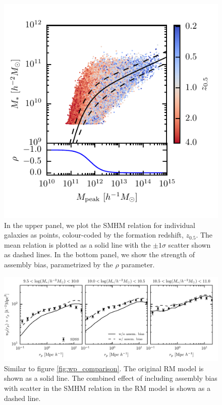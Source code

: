 \documentclass[useAMS,fleqn,usenatbib]{mnras}
\begin{document}
\begin{figure}
    \includegraphics[width=\columnwidth]{figures/smhm_assem_bias.pdf}
    \caption{In the upper panel, we plot the SMHM relation for individual galaxies as points, colour-coded by the formation redshift, $z_{0.5}$.  The mean relation is plotted as a solid line with the $\pm 1\sigma$ scatter shown as dashed lines.  In the bottom panel, we show the strength of assembly bias, parametrized by the $\rho$ parameter.}
    \label{fig:assem_bias_smhm}
\end{figure} 

\begin{figure}
    \includegraphics[width=\textwidth]{figures/wp_comparison_assem_bias.pdf}
    \caption{Similar to figure \ref{fig:wp_comparison}.  The original RM model is shown as a solid line.  The combined effect of including assembly bias with scatter in the SMHM relation in the RM model is shown as a dashed line.}
    \label{fig:wp_comparison_assem_bias}
\end{figure}
\end{document}

